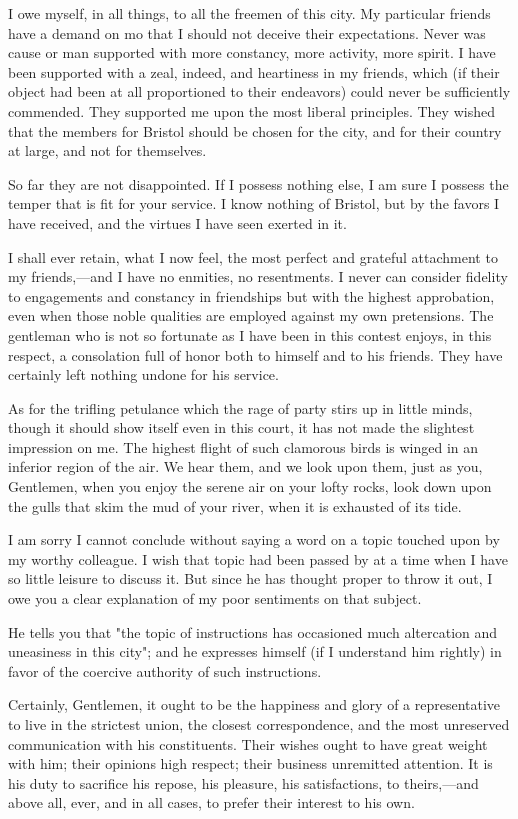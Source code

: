 I owe myself, in all things, to all the freemen of this city. My particular friends have a demand on mo that I should not deceive their expectations. Never was cause or man supported with more constancy, more activity, more spirit. I have been supported with a zeal, indeed, and heartiness in my friends, which (if their object had been at all proportioned to their endeavors) could never be sufficiently commended. They supported me upon the most liberal principles. They wished that the members for Bristol should be chosen for the city, and for their country at large, and not for themselves.

So far they are not disappointed. If I possess nothing else, I am sure I possess the temper that is fit for your service. I know nothing of Bristol, but by the favors I have received, and the virtues I have seen exerted in it.

I shall ever retain, what I now feel, the most perfect and grateful attachment to my friends,—and I have no enmities, no resentments. I never can consider fidelity to engagements and constancy in friendships but with the highest approbation, even when those noble qualities are employed against my own pretensions. The gentleman who is not so fortunate as I have been in this contest enjoys, in this respect, a consolation full of honor both to himself and to his friends. They have certainly left nothing undone for his service.

As for the trifling petulance which the rage of party stirs up in little minds, though it should show itself even in this court, it has not made the slightest impression on me. The highest flight of such clamorous birds is winged in an inferior region of the air. We hear them, and we look upon them, just as you, Gentlemen, when you enjoy the serene air on your lofty rocks, look down upon the gulls that skim the mud of your river, when it is exhausted of its tide.

I am sorry I cannot conclude without saying a word on a topic touched upon by my worthy colleague. I wish that topic had been passed by at a time when I have so little leisure to discuss it. But since he has thought proper to throw it out, I owe you a clear explanation of my poor sentiments on that subject.

He tells you that "the topic of instructions has occasioned much altercation and uneasiness in this city"; and he expresses himself (if I understand him rightly) in favor of the coercive authority of such instructions.

Certainly, Gentlemen, it ought to be the happiness and glory of a representative to live in the strictest union, the closest correspondence, and the most unreserved communication with his constituents. Their wishes ought to have great weight with him; their opinions high respect; their business unremitted attention. It is his duty to sacrifice his repose, his pleasure, his satisfactions, to theirs,—and above all, ever, and in all cases, to prefer their interest to his own.

